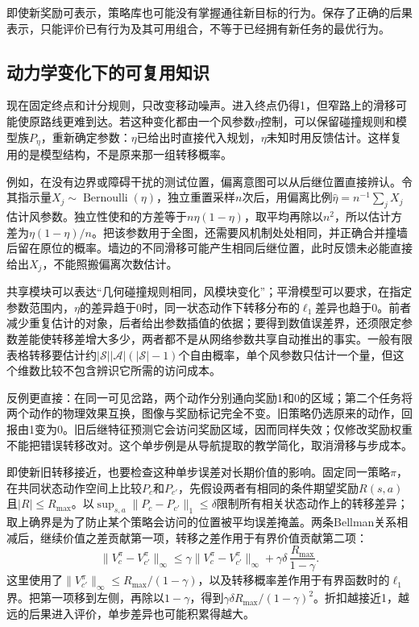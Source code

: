 即使新奖励可表示，策略库也可能没有掌握通往新目标的行为。保存了正确的后果表示，只能评价已有行为及其可用组合，不等于已经拥有新任务的最优行为。

\subsection{动力学变化下的可复用知识}
\label{sec:rl-transfer-dynamics-change}

现在固定终点和计分规则，只改变移动噪声。进入终点仍得1，但窄路上的滑移可能使原路线更难到达。若这种变化都由一个风参数$\eta$控制，可以保留碰撞规则和模型族$P_\eta$，重新确定参数：$\eta$已给出时直接代入规划，$\eta$未知时用反馈估计。这样复用的是模型结构，不是原来那一组转移概率。

例如，在没有边界或障碍干扰的测试位置，偏离意图可以从后继位置直接辨认。令其指示量$X_j\sim\operatorname{Bernoulli}(\eta)$，独立重置采样$n$次后，用偏离比例$\widehat\eta=n^{-1}\sum_jX_j$估计风参数。独立性使和的方差等于$n\eta(1-\eta)$，取平均再除以$n^2$，所以估计方差为$\eta(1-\eta)/n$。把该参数用于全图，还需要风机制处处相同，并正确合并撞墙后留在原位的概率。墙边的不同滑移可能产生相同后继位置，此时反馈未必能直接给出$X_j$，不能照搬偏离次数估计。

共享模块可以表达“几何碰撞规则相同，风模块变化”；平滑模型可以要求，在指定参数范围内，$\eta$的差异趋于0时，同一状态动作下转移分布的$\ell_1$差异也趋于0。前者减少重复估计的对象，后者给出参数插值的依据；要得到数值误差界，还须限定参数差能使转移差增大多少，两者都不是从网络参数共享自动推出的事实。一般有限表格转移要估计约$|\mathcal S||\mathcal A|(|\mathcal S|-1)$个自由概率，单个风参数只估计一个量，但这个维数比较不包含辨识它所需的访问成本。

反例更直接：在同一可见岔路，两个动作分别通向奖励1和0的区域；第二个任务将两个动作的物理效果互换，图像与奖励标记完全不变。旧策略仍选原来的动作，回报由1变为0。旧后继特征预测它会访问奖励区域，因而同样失效；仅修改奖励权重不能把错误转移改对。这个单步例是从导航提取的教学简化，取消滑移与步成本。

即使新旧转移接近，也要检查这种单步误差对长期价值的影响。固定同一策略$\pi$，在共同状态动作空间上比较$P_c$和$P_{c'}$，先假设两者有相同的条件期望奖励$R(s,a)$且$|R|\leq R_{\max}$。以$\sup_{s,a}\lVert P_c-P_{c'}\rVert_1\leq\delta$限制所有相关状态动作上的转移差异；取上确界是为了防止某个策略会访问的位置被平均误差掩盖。两条Bellman关系相减后，继续价值之差贡献第一项，转移之差作用于有界价值贡献第二项：
\[
 \lVert V_c^\pi-V_{c'}^\pi\rVert_\infty
 \leq \gamma\lVert V_c^\pi-V_{c'}^\pi\rVert_\infty
      +\gamma\delta\,\frac{R_{\max}}{1-\gamma}.
\]
这里使用了$\lVert V_{c'}^\pi\rVert_\infty\leq R_{\max}/(1-\gamma)$，以及转移概率差作用于有界函数时的$\ell_1$界。把第一项移到左侧，再除以$1-\gamma$，得到$\gamma\delta R_{\max}/(1-\gamma)^2$。折扣越接近1，越远的后果进入评价，单步差异也可能积累得越大。

